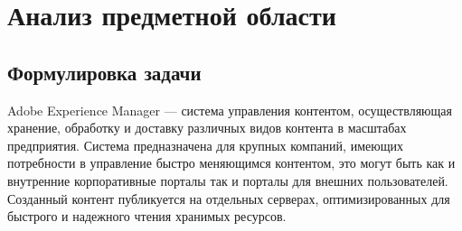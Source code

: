 \chapter{Анализ предметной области}
\label{cha:analysis}
%
%


\section{Формулировка задачи}
Adobe Experience Manager — система управления контентом, осуществляющая хранение, обработку и доставку различных видов контента в масштабах предприятия. Система предназначена для крупных компаний, имеющих потребности в управление быстро меняющимся контентом, это могут быть как и внутренние корпоративные порталы так и порталы для внешних пользователей. Созданный контент публикуется на отдельных серверах, оптимизированных для быстрого и надежного чтения хранимых ресурсов.

